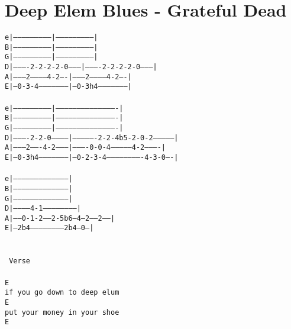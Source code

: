 \newpage
\section{Deep Elem Blues - Grateful Dead}
\label{Deep Elem Blues - Grateful Dead}
\texttt{e|---------------------------|---------------------------|\\
B|---------------------------|---------------------------|\\
G|---------------------------|---------------------------|\\
D|----------2-2-2-2-0--------|----------2-2-2-2-0--------|\\
A|--------2-----------4-2----|--------2-----------4-2----|\\
E|--0-3-4--------------------|--0-3h4--------------------|\\
\\
e|---------------------------|-------------------------------------------|\\
B|---------------------------|-------------------------------------------|\\
G|---------------------------|-------------------------------------------|\\
D|----------2-2-0------------|----------------2-2-4b5-2-0-2--------------|\\
A|--------2-------4-2--------|----------0-0-4---------------4-2----------|\\
E|--0-3h4--------------------|--0-2-3-4-------------------------4-3-0----|\\
\\
e|---------------------------------------|\\
B|---------------------------------------|\\
G|---------------------------------------|\\
D|------------4-1------------------------|\\
A|------0-1-2-----2-5b6--4--2------2-----|\\
E|--2b4------------------------2b4---0---|\\
\\
\\
\lbrack\ Verse\rbrack\\
\\
E\\
if\ you\ go\ down\ to\ deep\ elum\\
E\\
put\ your\ money\ in\ your\ shoe\\
E\\
}
